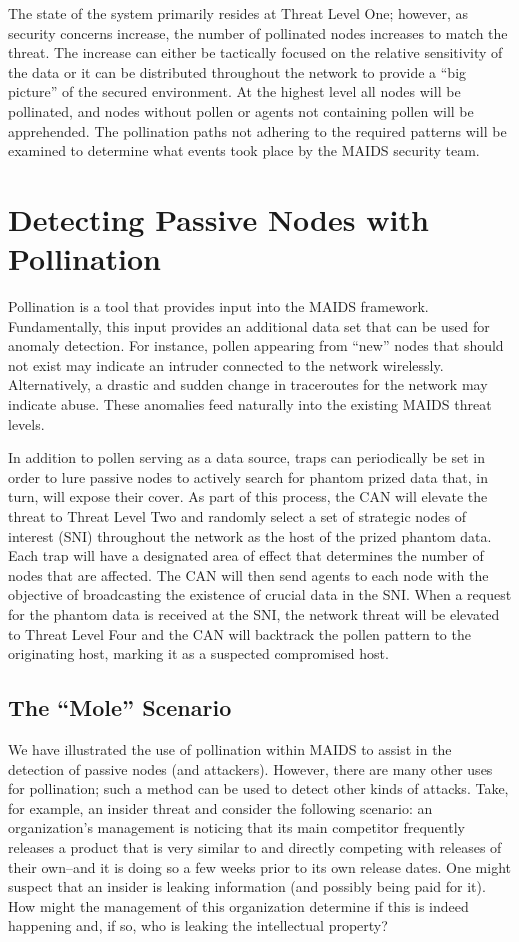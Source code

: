 \documentclass{acm_proc_article-sp}
\begin{document}
The state of the system primarily resides at Threat Level One; however, as security concerns increase, the number of pollinated nodes increases to match the threat.  The increase can either be tactically focused on the relative sensitivity of the data or it can be distributed throughout the network to provide a ``big picture'' of the secured environment.  At the highest level all nodes will be pollinated, and nodes without pollen or agents not containing pollen will be apprehended.  The pollination paths not adhering to the required patterns will be examined to determine what events took place by the MAIDS security team.

\section{Detecting Passive Nodes with\\Pollination}
Pollination is a tool that provides input into the MAIDS framework.  Fundamentally, this input provides an additional data set that can be used for anomaly detection.  For instance, pollen appearing from ``new'' nodes that should not exist may indicate an intruder connected to the network wirelessly.  Alternatively, a drastic and sudden change in traceroutes for the network may indicate abuse.  These anomalies feed naturally into the existing MAIDS threat levels.

In addition to pollen serving as a data source, traps can periodically be set in order to lure passive nodes to actively search for phantom prized data that, in turn, will expose their cover.  As part of this process, the CAN will elevate the threat to Threat Level Two and randomly select a set of strategic nodes of interest (SNI) throughout the network as the host of the prized phantom data.  Each trap will have a designated area of effect that determines the number of nodes that are affected.  The CAN will then send agents to each node with the objective of broadcasting the existence of crucial data in the SNI.  When a request for the phantom data is received at the SNI, the network threat will be elevated to Threat Level Four and the CAN will backtrack the pollen pattern to the originating host, marking it as a suspected compromised host.

\subsection{The ``Mole'' Scenario}
We have illustrated the use of pollination within MAIDS to assist in the detection of passive nodes (and attackers).  However, there are many other uses for pollination; such a method can be used to detect other kinds of attacks.  Take, for example, an insider threat and consider the following scenario: an organization's management is noticing that its main competitor frequently releases a product that is very similar to and directly competing with releases of their own--and it is doing so a few weeks prior to its own release dates.  One might suspect that an insider is leaking information (and possibly being paid for it).  How might the management of this organization determine if this is indeed happening and, if so, who is leaking the intellectual property?
\end{document}
